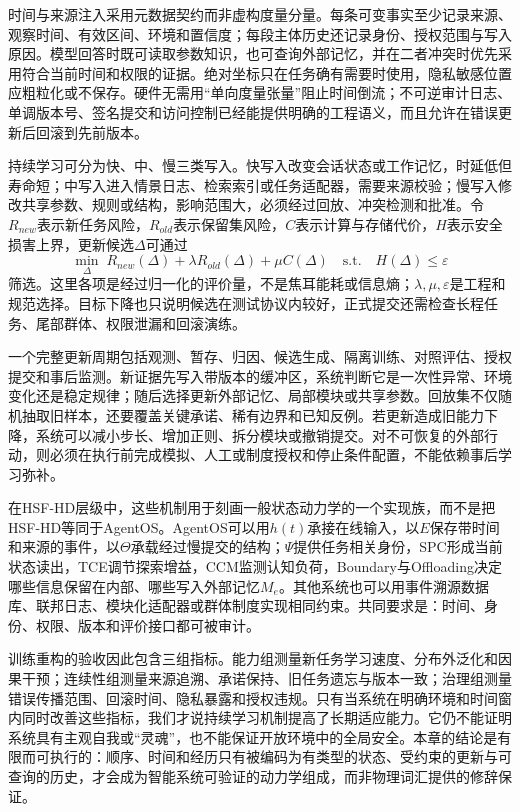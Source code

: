 时间与来源注入采用元数据契约而非虚构度量分量。每条可变事实至少记录来源、观察时间、有效区间、环境和置信度；每段主体历史还记录身份、授权范围与写入原因。模型回答时既可读取参数知识，也可查询外部记忆，并在二者冲突时优先采用符合当前时间和权限的证据。绝对坐标只在任务确有需要时使用，隐私敏感位置应粗粒化或不保存。硬件无需用“单向度量张量”阻止时间倒流；不可逆审计日志、单调版本号、签名提交和访问控制已经能提供明确的工程语义，而且允许在错误更新后回滚到先前版本。

持续学习可分为快、中、慢三类写入。快写入改变会话状态或工作记忆，时延低但寿命短；中写入进入情景日志、检索索引或任务适配器，需要来源校验；慢写入修改共享参数、规则或结构，影响范围大，必须经过回放、冲突检测和批准。令$R_{new}$表示新任务风险，$R_{old}$表示保留集风险，$C$表示计算与存储代价，$H$表示安全损害上界，更新候选$\Delta$可通过
\[
\min_{\Delta}\;R_{new}(\Delta)+\lambda R_{old}(\Delta)+\mu C(\Delta)
\quad\text{s.t.}\quad H(\Delta)\leq\varepsilon
\]
筛选。这里各项是经过归一化的评价量，不是焦耳能耗或信息熵；$\lambda,\mu,\varepsilon$是工程和规范选择。目标下降也只说明候选在测试协议内较好，正式提交还需检查长程任务、尾部群体、权限泄漏和回滚演练。

一个完整更新周期包括观测、暂存、归因、候选生成、隔离训练、对照评估、授权提交和事后监测。新证据先写入带版本的缓冲区，系统判断它是一次性异常、环境变化还是稳定规律；随后选择更新外部记忆、局部模块或共享参数。回放集不仅随机抽取旧样本，还要覆盖关键承诺、稀有边界和已知反例。若更新造成旧能力下降，系统可以减小步长、增加正则、拆分模块或撤销提交。对不可恢复的外部行动，则必须在执行前完成模拟、人工或制度授权和停止条件配置，不能依赖事后学习弥补。

在HSF-HD层级中，这些机制用于刻画一般状态动力学的一个实现族，而不是把HSF-HD等同于AgentOS。AgentOS可以用$h(t)$承接在线输入，以$E$保存带时间和来源的事件，以$\Theta$承载经过慢提交的结构；$\Psi$提供任务相关身份，SPC形成当前状态读出，TCE调节探索增益，CCM监测认知负荷，Boundary与Offloading决定哪些信息保留在内部、哪些写入外部记忆$M_e$。其他系统也可以用事件溯源数据库、联邦日志、模块化适配器或群体制度实现相同约束。共同要求是：时间、身份、权限、版本和评价接口都可被审计。

训练重构的验收因此包含三组指标。能力组测量新任务学习速度、分布外泛化和因果干预；连续性组测量来源追溯、承诺保持、旧任务遗忘与版本一致；治理组测量错误传播范围、回滚时间、隐私暴露和授权违规。只有当系统在明确环境和时间窗内同时改善这些指标，我们才说持续学习机制提高了长期适应能力。它仍不能证明系统具有主观自我或“灵魂”，也不能保证开放环境中的全局安全。本章的结论是有限而可执行的：顺序、时间和经历只有被编码为有类型的状态、受约束的更新与可查询的历史，才会成为智能系统可验证的动力学组成，而非物理词汇提供的修辞保证。
